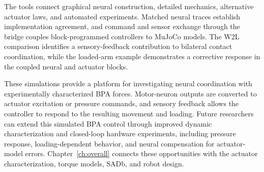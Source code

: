 The tools connect graphical neural construction, detailed mechanics, alternative actuator laws, and automated experiments. Matched neural traces establish implementation agreement, and command and sensor exchange through the bridge couples block-programmed controllers to MuJoCo models. The W2L comparison identifies a sensory-feedback contribution to bilateral contact coordination, while the loaded-arm example demonstrates a corrective response in the coupled neural and actuator blocks.

These simulations provide a platform for investigating neural coordination with experimentally characterized BPA forces. Motor-neuron outputs are converted to actuator excitation or pressure commands, and sensory feedback allows the controller to respond to the resulting movement and loading. Future researchers can extend this simulated BPA control through improved dynamic characterization and closed-loop hardware experiments, including pressure response, loading-dependent behavior, and neural compensation for actuator-model errors. Chapter~\ref{ch:overall} connects these opportunities with the actuator characterization, torque models, SADb, and robot design.
